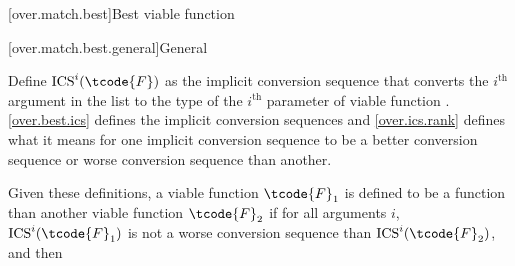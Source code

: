 [over.match.best]{Best viable function}%

[over.match.best.general]{General}%

\pnum
{}%
Define $\text{ICS}^i(\tcode{F})$ as
the implicit conversion sequence that converts
the $i^\text{th}$ argument in the list to the type of
the $i^\text{th}$ parameter of viable function .
\ref{over.best.ics} defines the implicit conversion sequences and \ref{over.ics.rank}
defines what it means for one implicit conversion sequence to be
a better conversion sequence or worse conversion sequence than
another.

\pnum
Given these definitions,
a viable function $\tcode{F}_1$ is defined to be a
function than another viable function $\tcode{F}_2$
if for all arguments $i$,
$\text{ICS}^i(\tcode{F}_1)$ is not a worse conversion
sequence than $\text{ICS}^i(\tcode{F}_2)$, and then
